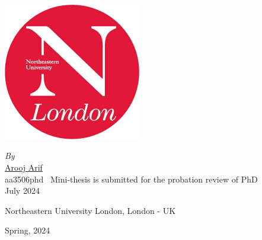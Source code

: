 
\begin{center}

\LARGE {}

\end{center}

\begin{center}
	\includegraphics[width=6cm]{nu_logo.jpeg}
\end{center}
\begin{center}
\emph{\large By}\\

\Large {\href{https://scholar.google.com/citations?hl=en&user=ZEwBUxwAAAAJ&view_op=list_works&authuser=1&gmla=AILGF5XqzU9IqXxSuitd8SwCxQWSLHy9OoSQ59cgiyOt3Pi35gv5n8bJg_gLqFhg9SZZv2U2fvQ7DMDOmR6oiGnT5TQkhZ-vwzUvrJNRPEY2m2XMukSMolIK07cvFv6HJGZ6fEN2UhAmB9NIRd1pNy95LBWH7vzvwukF9plB9Ag}{\color{blue} Arooj Arif}}\\
\Large aa3506phd\
\vfill
\Large Mini-thesis is submitted for the probation review of PhD\\
\Large July 2024\\
\end{center}
\vfill

\begin{center}
\Large Northeastern University London, London - UK
\end{center}

\begin{center}
\LARGE Spring, 2024
\end{center} 
\thispagestyle{empty}